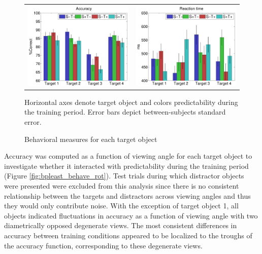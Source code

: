 \documentclass[dwyatte_dissertation.tex]{subfiles}
\begin{document}
\begin{figure}[h!]
\begin{center}
\begin{tabular}{ll}
\includegraphics[width=80mm]{figs/chap_bpleast/results_accuracy_obj.pdf} &
\includegraphics[width=80mm]{figs/chap_bpleast/results_rt_obj.pdf} \\
\end{tabular}
\end{center}
\caption{Behavioral measures for each target object}{Horizontal axes denote target object and colors predictability during the training period. Error bars depict between-subjects standard error.}
\label{fig:bpleast_behave_obj}
\end{figure}

Accuracy was computed as a function of viewing angle for each target object to investigate whether it interacted with predictability during the training period (Figure \ref{fig:bpleast_behave_rot}). Test trials during which distractor objects were presented were excluded from this analysis since there is no consistent relationship between the targets and distractors across viewing angles and thus they would only contribute noise. With the exception of target object 1, all objects indicated fluctuations in accuracy as a function of viewing angle with two diametrically opposed degenerate views. The most consistent differences in accuracy between training conditions appeared to be localized to the troughs of the accuracy function, corresponding to these degenerate views.
\end{document}
